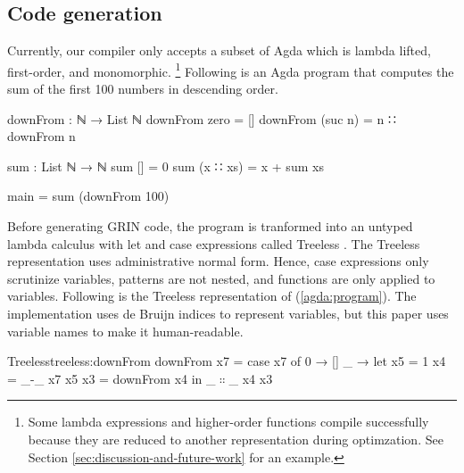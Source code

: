 \documentclass[9pt, twocolumn]{article}
\newcommand{\refp}[1]{(\ref{#1})}
\begin{document}
\subsection{Code generation}
Currently, our compiler only accepts a subset of Agda which is lambda lifted, first-order, and monomorphic.%
\footnote{%
Some lambda expressions and higher-order functions compile successfully because they are reduced to another representation during optimzation. 
See Section \ref{sec:discussion-and-future-work} for an example.
}
Following is an Agda program that computes the sum of the first 100 numbers in descending order. 
\begin{code}[number=agda:program]
downFrom : ℕ → List ℕ
downFrom zero = []
downFrom (suc n) = n ∷ downFrom n 

sum : List ℕ → ℕ
sum [] = 0
sum (x ∷ xs) = x + sum xs

main = sum (downFrom 100) 
\end{code}

Before generating GRIN code, the program is tranformed into an untyped lambda calculus with let and case expressions called Treeless \citep{hausmann2015}.
The Treeless representation uses administrative normal form. 
Hence, case expressions only scrutinize variables, patterns are not nested, and functions are only applied to variables.
Following is the Treeless representation of  \refp{agda:program}.
The implementation uses de Bruijn indices to represent variables, but this paper uses variable names to make it human-readable. 

\begin{typewriter}{Treeless}{treeless:downFrom}
downFrom x7 = case x7 of
  0 → []
  _ → let x5 = 1
          x4 = _-_ x7 x5
          x3 = downFrom x4 in 
      _$∷$_ x4 x3
\end{typewriter}

\end{document}
